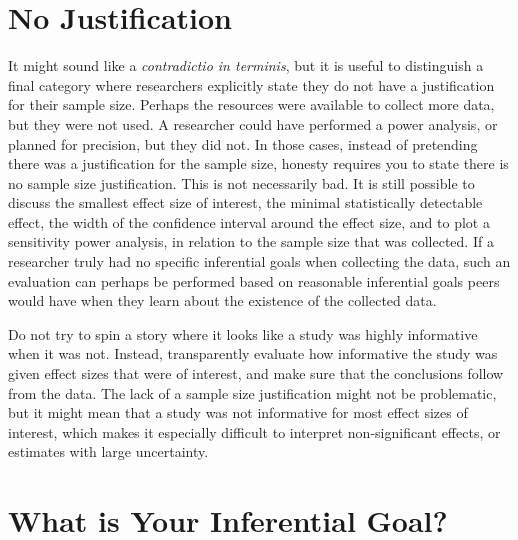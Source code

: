 \documentclass[
  oneside]{krantz}
\begin{document}
\hypertarget{no-justification}{%
\section{No Justification}\label{no-justification}}

It might sound like a \emph{contradictio in terminis}, but it is useful to distinguish a final category where researchers explicitly state they do not have a justification for their sample size. Perhaps the resources were available to collect more data, but they were not used. A researcher could have performed a power analysis, or planned for precision, but they did not. In those cases, instead of pretending there was a justification for the sample size, honesty requires you to state there is no sample size justification. This is not necessarily bad. It is still possible to discuss the smallest effect size of interest, the minimal statistically detectable effect, the width of the confidence interval around the effect size, and to plot a sensitivity power analysis, in relation to the sample size that was collected. If a researcher truly had no specific inferential goals when collecting the data, such an evaluation can perhaps be performed based on reasonable inferential goals peers would have when they learn about the existence of the collected data.

Do not try to spin a story where it looks like a study was highly informative when it was not. Instead, transparently evaluate how informative the study was given effect sizes that were of interest, and make sure that the conclusions follow from the data. The lack of a sample size justification might not be problematic, but it might mean that a study was not informative for most effect sizes of interest, which makes it especially difficult to interpret non-significant effects, or estimates with large uncertainty.

\hypertarget{what-is-your-inferential-goal}{%
\section{What is Your Inferential Goal?}\label{what-is-your-inferential-goal}}
\end{document}
